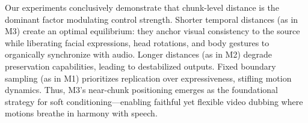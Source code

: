 Our experiments conclusively demonstrate that chunk-level distance is the dominant factor modulating control strength. Shorter temporal distances (as in M3) create an optimal equilibrium: they anchor visual consistency to the source while liberating facial expressions, head rotations, and body gestures to organically synchronize with audio. Longer distances (as in M2) degrade preservation capabilities, leading to destabilized outputs. Fixed boundary sampling (as in M1) prioritizes replication over expressiveness, stifling motion dynamics. Thus, M3’s near-chunk positioning emerges as the foundational strategy for soft conditioning—enabling faithful yet flexible video dubbing where motions breathe in harmony with speech. 


